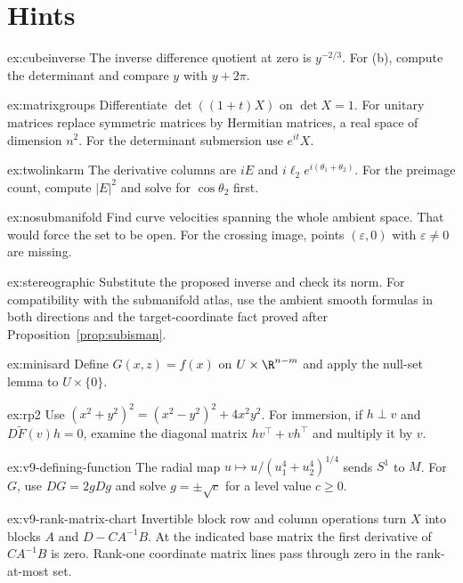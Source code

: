 \section{Hints}

\begin{hint}{ex:cubeinverse}
The inverse difference quotient at zero is $y^{-2/3}$. For (b), compute the determinant and compare $y$ with $y+2\pi$.
\end{hint}
\begin{hint}{ex:matrixgroups}
Differentiate $\det((1+t)X)$ on $\det X=1$. For unitary matrices replace symmetric matrices by Hermitian matrices, a real space of dimension $n^2$. For the determinant submersion use $e^{it}X$.
\end{hint}
\begin{hint}{ex:twolinkarm}
The derivative columns are $iE$ and $i\ell_2e^{i(\theta_1+\theta_2)}$. For the preimage count, compute $|E|^2$ and solve for $\cos\theta_2$ first.
\end{hint}
\begin{hint}{ex:nosubmanifold}
Find curve velocities spanning the whole ambient space. That would force the set to be open. For the crossing image, points $(\varepsilon,0)$ with $\varepsilon\ne0$ are missing.
\end{hint}
\begin{hint}{ex:stereographic}
Substitute the proposed inverse and check its norm. For compatibility with the submanifold atlas, use the ambient smooth formulas in both directions and the target-coordinate fact proved after Proposition~\ref{prop:subisman}.
\end{hint}
\begin{hint}{ex:minisard}
Define $G(x,z)=f(x)$ on $U\times\R^{n-m}$ and apply the null-set lemma to $U\times\{0\}$.
\end{hint}
\begin{hint}{ex:rp2}
Use $(x^2+y^2)^2=(x^2-y^2)^2+4x^2y^2$. For immersion, if $h\perp v$ and $D\tilde F(v)h=0$, examine the diagonal matrix $hv^\top+vh^\top$ and multiply it by $v$.
\end{hint}
\begin{hint}{ex:v9-defining-function}
The radial map $u\mapsto u/(u_1^4+u_2^4)^{1/4}$ sends $S^1$ to $M$. For $G$, use $DG=2gDg$ and solve $g=\pm\sqrt c$ for a level value $c\ge0$.
\end{hint}
\begin{hint}{ex:v9-rank-matrix-chart}
Invertible block row and column operations turn $X$ into blocks $A$ and $D-CA^{-1}B$. At the indicated base matrix the first derivative of $CA^{-1}B$ is zero. Rank-one coordinate matrix lines pass through zero in the rank-at-most set.
\end{hint}
